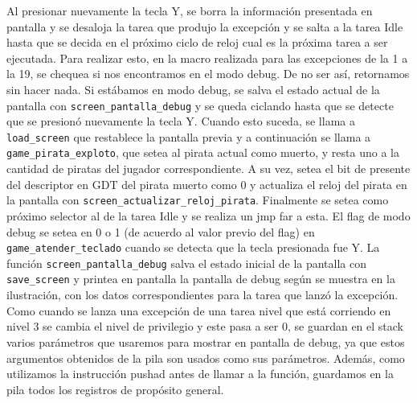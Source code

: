 Al presionar nuevamente la tecla Y, se borra la información presentada en pantalla y se desaloja la tarea que produjo la excepción y se salta a la tarea Idle hasta que se decida en el próximo ciclo de reloj cual es la próxima tarea a ser ejecutada.
Para realizar esto, en la macro realizada para las excepciones de la 1 a la 19, se chequea si nos encontramos en el modo debug. De no ser así, retornamos sin hacer nada. Si estábamos en modo debug, se salva el estado actual de la pantalla con \texttt{screen\_pantalla\_debug} y se queda ciclando hasta que se detecte que se presionó nuevamente la tecla Y. Cuando esto suceda, se llama a \texttt{load\_screen} que restablece la pantalla previa y a continuación se llama a \texttt{game\_pirata\_exploto}, que setea al pirata actual como muerto, y resta uno a la cantidad de piratas del jugador correspondiente. A su vez, setea el bit de presente del descriptor en GDT del pirata muerto como 0 y actualiza el reloj del pirata en la pantalla con \texttt{screen\_actualizar\_reloj\_pirata}. 
Finalmente se setea como próximo selector al de la tarea Idle y se realiza un jmp far a esta.
El flag de modo debug se setea en 0 o 1 (de acuerdo al valor previo del flag) en \texttt{game\_atender\_teclado} cuando se detecta que la tecla presionada fue Y.
La función \texttt{screen\_pantalla\_debug} salva el estado inicial de la pantalla con \texttt{save\_screen} y printea en pantalla la pantalla de debug según se muestra en la ilustración, con los datos correspondientes para la tarea que lanzó la excepción.
Como cuando se lanza una excepción de una tarea nivel que está corriendo en nivel 3 se cambia el nivel de privilegio y este pasa a ser 0, se guardan en el stack varios parámetros que usaremos para mostrar en pantalla de debug, ya que estos argumentos obtenidos de la pila son usados como sus parámetros. Además, como utilizamos la instrucción pushad antes de llamar a la función, guardamos en la pila todos los registros de propósito general. 


